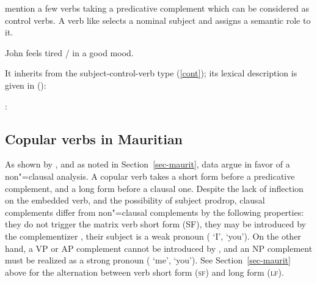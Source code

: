 \citet{PollardandSag1994}\addpages mention a few verbs taking a predicative complement which can be
considered as control verbs. A verb like  selects a nominal subject and assigns a
semantic role to it.

\begin{exe}
\ex John feels tired / in a good mood.
\end{exe}

\noindent
It inherits from the subject-control-verb type (\ref{cont}); its lexical description is given in ():

\eas
{}:\\
\zs


\subsection{Copular verbs in Mauritian}

As shown by \citet{HenriandLaurens2011}, and as noted in Section~\ref{sec-maurit},  data
argue in favor
of a non"=clausal analysis. A copular verb takes a short form before a
predicative complement, and
a long form before a clausal one. Despite the lack of inflection on the embedded verb, and the
possibility of subject prodrop, clausal complements differ from non"=clausal complements by the
following properties: they do not trigger the matrix verb short form (SF), they may be introduced by
the complementizer , their subject is a weak pronoun ( `I',  `you'). On
the other hand, a VP or AP complement cannot be introduced by , and an NP complement must
be realized as a strong pronoun ( `me',  `you'). See Section~\ref{sec-maurit}
above for the alternation between verb short form (\textsc{sf}) and long form (\textsc{lf}).

